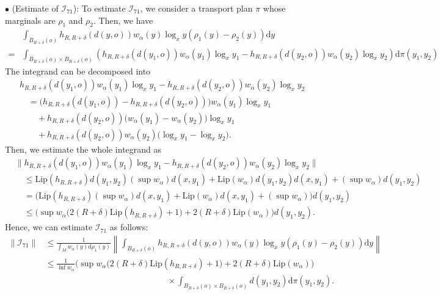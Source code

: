 \documentclass[11pt]{amsart}
\def\d{\mathrm{d}}
\newcommand{\p}{o}%
\newcommand{\dist}{d}%
\begin{document}
\noindent $\bullet$ (Estimate of $\mathcal I_{71}$):  To estimate $\mathcal{I}_{71}$, we consider a transport plan $\pi$ whose marginals are $\rho_1$ and $\rho_2$. Then, we have
\begin{align*}
&\int_{B_{R+\delta}(\p)}h_{R, R+\delta}(\dist(y, \p))w_\alpha(y)\log_xy(\rho_1(y)-\rho_2(y))\d y\\
=&\int_{B_{R+\delta}(\p)\times B_{R+\delta}(\p)}\left(h_{R, R+\delta}(\dist(y_1, \p))w_\alpha(y_1)\log_xy_1-h_{R, R+\delta}(\dist(y_2, \p))w_\alpha(y_2)\log_xy_2\right)\d\pi(y_1, y_2)
\end{align*}
The integrand can be decomposed into
\begin{align*}
&h_{R, R+\delta}(\dist(y_1, \p))w_\alpha(y_1)\log_xy_1-h_{R, R+\delta}(\dist(y_2, \p))w_\alpha(y_2)\log_xy_2\\
&\quad=\bigg(h_{R, R+\delta}(\dist(y_1, \p))-h_{R, R+\delta}(\dist(y_2, \p))\bigg)w_\alpha(y_1)\log_xy_1\\
&\quad\quad+h_{R, R+\delta}(\dist(y_2, \p))\bigg(w_\alpha(y_1)-w_\alpha(y_2)\bigg)\log_xy_1\\
&\quad \quad +h_{R,R+\delta}(\dist(y_2,\p))w_\alpha(y_2)\bigg(\log_xy_1-\log_xy_2\bigg).
\end{align*}
Then, we   estimate the whole integrand as
\begin{align*}
&\|h_{R, R+\delta}(\dist(y_1, \p))w_\alpha(y_1)\log_xy_1-h_{R, R+\delta}(\dist(y_2, \p))w_\alpha(y_2)\log_xy_2\|\\
&\quad \leq  \mathrm{Lip}(h_{R,R+\delta})\dist(y_1, y_2)(\sup w_\alpha)\dist(x, y_1)+\mathrm{Lip}(w_\alpha)\dist(y_1, y_2)\dist(x, y_1)+(\sup w_\alpha)\dist(y_1, y_2)\\
&\quad = \bigg(\mathrm{Lip}(h_{R,R+\delta})(\sup w_\alpha)\dist(x, y_1)+\mathrm{Lip}(w_\alpha)\dist(x, y_1)+(\sup w_\alpha)\bigg)\dist(y_1, y_2)\\
&\quad \leq\bigg(\sup w_\alpha\big(2(R+\delta)\mathrm{Lip}(h_{R,R+\delta})+1\big)+2(R+\delta)\mathrm{Lip}(w_\alpha)\bigg)\dist(y_1, y_2).
\end{align*}
Hence, we can estimate $\mathcal{I}_{71}$ as follows:
\begin{align*}
\|\mathcal{I}_{71}\|&\leq\frac{1}{\int_{M}w_\alpha(y)\d \rho_1(y)}\left\|\int_{B_{R+\delta}(\p)}h_{R, R+\delta}(\dist(y, \p))w_\alpha(y)\log_xy(\rho_1(y)-\rho_2(y))\d y\right\|\\
&\leq\frac{1}{\inf w_\alpha}\bigg(\sup w_\alpha\big(2(R+\delta)\mathrm{Lip}(h_{R,R+\delta})+1\big)+2(R+\delta)\mathrm{Lip}(w_\alpha)\bigg)\\
&\hspace{6cm}\times\int_{B_{R+\delta}(\p)\times B_{R+\delta}(\p)}\dist(y_1, y_2)\d\pi(y_1, y_2).
\end{align*}
\end{document}
